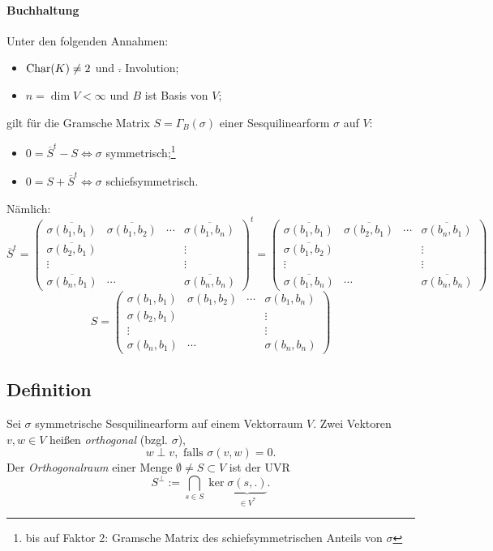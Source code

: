 \paragraph{Buchhaltung}
	Unter den folgenden Annahmen:
		\begin{itemize}
			\item $ \operatorname{Char}(K)\neq 2 $ und $ \bar{.} $ Involution;
			\item $ n=\dim V <\infty $ und $ B $ ist Basis von $ V $;
		\end{itemize}
	gilt für die Gramsche Matrix $ S = \Gamma_B(\sigma) $ einer Sesquilinearform $ \sigma $ auf $ V $:
		\begin{itemize}
			\item $ 0 = \overline{S}^t-S\Leftrightarrow \sigma $ symmetrisch;\footnote{bis auf Faktor 2: Gramsche Matrix des schiefsymmetrischen Anteils von $ \sigma $}
			\item $ 0 = S + \overline{S}^t \Leftrightarrow \sigma $ schiefsymmetrisch.
		\end{itemize}
	Nämlich:
		\[ \overline{S}^t = \begin{pmatrix}
		\overline{\sigma(b_1,b_1)} & \overline{\sigma(b_1,b_2)} &\cdots& \overline{\sigma(b_1,b_n)} \\ 
		\overline{\sigma(b_2,b_1)} &  & & \vdots \\ 
		\vdots &  & & \vdots \\ 
		\overline{\sigma(b_n,b_1)} & \cdots & & \overline{\sigma(b_n,b_n)}
		\end{pmatrix}^t =  \begin{pmatrix}
		\overline{\sigma(b_1,b_1)} & \overline{\sigma(b_2,b_1)} &\cdots& \overline{\sigma(b_n,b_1)} \\ 
		\overline{\sigma(b_1,b_2)} &  & & \vdots \\ 
		\vdots &  & & \vdots \\ 
		\overline{\sigma(b_1,b_n)} & \cdots & & \overline{\sigma(b_n,b_n)}
		\end{pmatrix} \]
		\[ S = \begin{pmatrix}
		\sigma(b_1,b_1) & \sigma(b_1,b_2) &\cdots& \sigma(b_1,b_n) \\ 
		\sigma(b_2,b_1) &  & & \vdots \\ 
		\vdots &  & & \vdots \\ 
		\sigma(b_n,b_1) & \cdots & & \sigma(b_n,b_n)
		\end{pmatrix} \]
		
\subsection{Definition} 
\begin{Definition}
	Sei $ \sigma $ symmetrische Sesquilinearform auf einem Vektorraum $ V $. Zwei Vektoren $ v,w\in V $ heißen \emph{orthogonal} (bzgl. $ \sigma $),
		\[ w \perp v, \text{ falls } \sigma(v,w) = 0. \]
	Der \emph{Orthogonalraum} einer Menge $ \emptyset \neq S\subset V $ ist der UVR
		\[ S^\perp := \bigcap_{s\in S} \ker \underset{\in V^*}{\underbrace{\sigma(s,.)}}. \]
\end{Definition}
